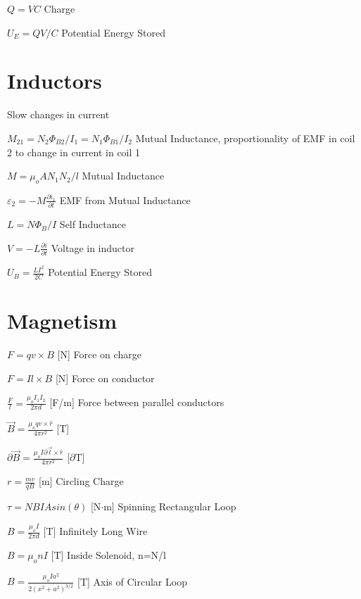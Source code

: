 \documentclass{article}
\begin{document}
\LARGE$Q =VC$
\large{Charge}

\LARGE$U_E = QV/C$
\large{Potential Energy Stored}


\section{Inductors }

\large Slow changes in current

\LARGE$M_{21} =N_2\Phi_{B2}/I_1=N_1\Phi_{B1}/I_2$
\large{Mutual Inductance, proportionality of EMF in coil 2 to change in current in coil 1}

\LARGE$M =\mu_oAN_1N_2/l$
\large{Mutual Inductance}


\LARGE$\varepsilon_2 =-M\frac{\partial{i_1}}{\partial{t}}$
\large{EMF from Mutual Inductance}

\LARGE$L =N\Phi_B/I$
\large{Self Inductance}

\LARGE$V =-L \frac{\partial{i}}{\partial{t}}$
\large{Voltage in inductor}

\LARGE$U_B = \frac{LI^2}{2C}$
\large{Potential Energy Stored}


\section{Magnetism}


\LARGE{$F=qv\times{B}$ }
\large{[N]}
\large{Force on charge}

\LARGE{$F=Il\times{B}$ }
\large{[N]}
\large{Force on conductor}

\LARGE{$\frac{F}{l}=\frac{\mu_oI_1I_2}{2\pi{d}}$ }
\large{[F/m]}
\large{Force between parallel conductors}


\LARGE{$\vec{B}=
    \frac{\mu_o qv \times \hat{r}}
    {4\pi r^2}$ }
\large{[T]}

\LARGE{$\partial\vec{B}=
    \frac{\mu_o I \partial\vec{l} \times \hat{r}}
    {4\pi r^2}$ }
\large{[$\partial$T]}

\LARGE{$r=\frac{mv}{qB}$}
\large{[m]}
\large Circling Charge


\LARGE{$\tau=NBIAsin(\theta)$ }
\large{[N$\cdot$m]}
\large{Spinning Rectangular Loop}

\LARGE{$B=
    \frac{\mu_o I}
    {2\pi d}$ }
\large{[T]}
\large Infinitely Long Wire

\LARGE{$B=
    \mu_{o}nI$ }
\large{[T]}
\large Inside Solenoid, n=N/l

\LARGE{$B=
    \frac{\mu_{o}Ia^2}
    {2(x^2+a^2)^{3/2}}$ }
\large{[T]}
\large Axis of Circular Loop
\end{document}
